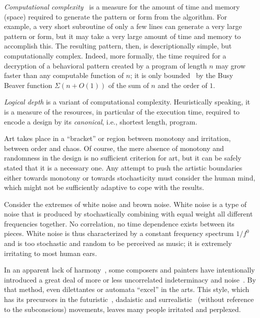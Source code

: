 \documentclass[rmp,amssymb,showpacs,showkeys,12pt,preprint]{revtex4}
\begin{document}
\textit{Computational complexity}~\cite{calude1,bennett-utm}
is a measure for the amount of time and
memory (space) required to generate the pattern or form from the algorithm.
For example, a very short subroutine of only a few lines can generate a very
large pattern or form, but it may take a very large amount of time and
memory to accomplish this. The resulting pattern, then, is descriptionally
simple, but computationally complex.
Indeed, more formally, the time required for a decryption of a behavioral pattern created by a program of length $n$ may grow faster than any computable function of $n$;
it is only bounded~\cite{rado,chaitin-ACM,dewdney,brady} by the Busy Beaver function $\Sigma (n+O(1))$ of the sum of $n$ and the order of $1$.

\textit{Logical depth} \cite{ch6,bennett1,bennett-utm}
is a variant of computational complexity.
Heuristically speaking, it is a measure of the resources, in particular of the execution time, required to encode a design by its {\em canonical}, i.e., shortest length, program.

Art takes place in a ``bracket'' or region between monotony and irritation, between order and chaos.
Of course, the mere absence of monotony and randomness in the design is no sufficient criterion for art, but it can be safely stated that it is a necessary one.
Any attempt to push the artistic boundaries either towards monotony or towards
stochasticity must consider the human mind, which might not be sufficiently adaptive to cope with the results.

Consider the extremes of white noise and brown noise. White
noise is a type of noise that is produced by stochastically combining with equal weight all different frequencies together.
No correlation, no time dependence exists between its pieces.
White noise is thus characterized by a constant frequency spectrum $1/f^0$ and is too stochastic and random to be perceived as music; it is extremely irritating to most human ears.

In an apparent lack of harmony~\cite{Cage-autobio}, some composers and painters have intentionally introduced a great deal of more or less uncorrelated indeterminacy and noise~\cite{Sangild}.
By that method, even dilettantes or automata ``excel'' in the arts.
This style, which has its precursors in the futuristic~\cite{Russolo-1913}, dadaistic and surrealistic~\cite{breton:30,breton:33} (without reference to the subconscious) movements,
leaves many people irritated and perplexed.
\end{document}
